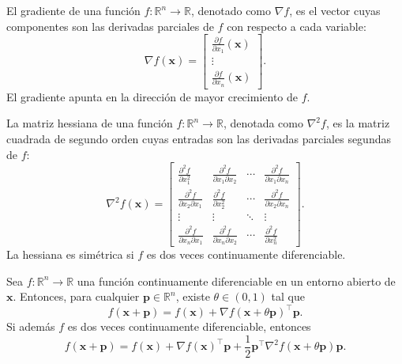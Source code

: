 \begin{definicion}[Gradiente]
\label{def:gradiente}
El gradiente de una función $f: \mathbb{R}^n \to \mathbb{R}$, denotado como $\nabla f$, es el vector cuyas componentes son las derivadas parciales de $f$ con respecto a cada variable:
\[
\nabla f(\mathbf{x}) = \begin{bmatrix}
\frac{\partial f}{\partial x_1}(\mathbf{x}) \\
\vdots \\
\frac{\partial f}{\partial x_n}(\mathbf{x})
\end{bmatrix}.
\]
El gradiente apunta en la dirección de mayor crecimiento de $f$.
\end{definicion}

\begin{definicion}[Hessiano]
\label{def:hessiano}
La matriz hessiana de una función $f: \mathbb{R}^n \to \mathbb{R}$, denotada como $\nabla^2 f$, es la matriz cuadrada de segundo orden cuyas entradas son las derivadas parciales segundas de $f$:
\[
\nabla^2 f(\mathbf{x}) = \begin{bmatrix}
\frac{\partial^2 f}{\partial x_1^2} & \frac{\partial^2 f}{\partial x_1 \partial x_2} & \cdots & \frac{\partial^2 f}{\partial x_1 \partial x_n} \\
\frac{\partial^2 f}{\partial x_2 \partial x_1} & \frac{\partial^2 f}{\partial x_2^2} & \cdots & \frac{\partial^2 f}{\partial x_2 \partial x_n} \\
\vdots & \vdots & \ddots & \vdots \\
\frac{\partial^2 f}{\partial x_n \partial x_1} & \frac{\partial^2 f}{\partial x_n \partial x_2} & \cdots & \frac{\partial^2 f}{\partial x_n^2}
\end{bmatrix}.
\]
La hessiana es simétrica si $f$ es dos veces continuamente diferenciable.
\end{definicion}

\begin{teorema}
\label{teo:taylor}
Sea $f: \mathbb{R}^n \rightarrow \mathbb{R}$ una función continuamente diferenciable en un entorno abierto de $\mathbf{x}$. Entonces, para cualquier $\mathbf{p} \in \mathbb{R}^n$, existe $\theta \in (0,1)$ tal que
\begin{equation}
f(\mathbf{x} + \mathbf{p}) = f(\mathbf{x}) + \nabla f(\mathbf{x} + \theta \mathbf{p})^\top \mathbf{p}.
\end{equation}
Si además $f$ es dos veces continuamente diferenciable, entonces
\begin{equation}
f(\mathbf{x} + \mathbf{p}) = f(\mathbf{x}) + \nabla f(\mathbf{x})^\top \mathbf{p} + \frac{1}{2} \mathbf{p}^\top \nabla^2 f(\mathbf{x} + \theta \mathbf{p}) \mathbf{p}.
\end{equation}
\end{teorema}

